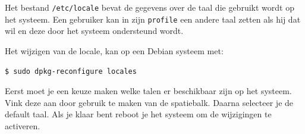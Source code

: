 Het bestand \texttt{/etc/locale} bevat de gegevens over de taal die gebruikt wordt op het systeem. Een gebruiker kan in zijn \texttt{profile} een andere taal zetten als hij dat wil en deze door het systeem ondersteund wordt.

Het wijzigen van de locale, kan op een Debian systeem met:
\begin{lstlisting}[language=bash]
$ sudo dpkg-reconfigure locales
\end{lstlisting}
Eerst moet je een keuze maken welke talen er beschikbaar zijn op het systeem. Vink deze aan door gebruik te maken van de spatiebalk. Daarna selecteer je de default taal. Als je klaar bent reboot je het systeem om de wijzigingen te activeren.

